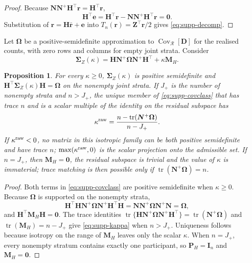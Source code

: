 \documentclass[12pt,a4paper]{article}
\newtheorem{proposition}{Proposition}
\theoremstyle{definition}
\theoremstyle{remark}\newtheorem{remark}{Remark}
\numberwithin{equation}{section}
\newcommand{\Cov}{\operatorname{Cov}}
\newcommand{\Rcal}{\mathcal R}
\begin{document}
\begin{proof}
Because $\bm N\bm N^+\bm H^\top\bm r=\bm H^\top\bm r$,
\[
\bm H^\top\bm e
=\bm H^\top\bm r-\bm N\bm N^+\bm H^\top\bm r
=\bm0.
\]
Substitution of $\bm r=\bm H\bar{\bm r}+\bm e$ into $T_n(\bm r)=\bm Z^\top\bm r/2$ gives \eqref{eq:supp-decomp}.
\end{proof}

Let $\bm\Omega$ be a positive-semidefinite approximation to $\Cov_{\Rcal}[\bm D]$ for the realised counts, with zero rows and columns for empty joint strata. Consider
\begin{equation}\label{eq:supp-covclass}
\bm\Sigma_Z(\kappa)
=\bm H\bm N^+\bm\Omega\bm N^+\bm H^\top
+\kappa\bm M_H.
\end{equation}

\begin{proposition}\label{prop:supp-completion}
For every $\kappa\ge0$, $\bm\Sigma_Z(\kappa)$ is positive semidefinite and $\bm H^\top\bm\Sigma_Z(\kappa)\bm H=\bm\Omega$ on the nonempty joint strata. If $J_+$ is the number of nonempty strata and $n>J_+$, the unique member of \eqref{eq:supp-covclass} that has trace $n$ and is a scalar multiple of the identity on the residual subspace has
\begin{equation}\label{eq:supp-kappa}
\kappa^{\rm raw}
=\frac{n-\operatorname{tr}(\bm N^+\bm\Omega)}{n-J_+}.
\end{equation}
If $\kappa^{\rm raw}<0$, no matrix in this isotropic family can be both positive semidefinite and have trace $n$; $\max(\kappa^{\rm raw},0)$ is the scalar projection onto the admissible set. If $n=J_+$, then $\bm M_H=\bm0$, the residual subspace is trivial and the value of $\kappa$ is immaterial; trace matching is then possible only if $\operatorname{tr}(\bm N^+\bm\Omega)=n$.
\end{proposition}

\begin{proof}
Both terms in \eqref{eq:supp-covclass} are positive semidefinite when $\kappa\ge0$. Because $\bm\Omega$ is supported on the nonempty strata,
\[
\bm H^\top\bm H\bm N^+\bm\Omega\bm N^+\bm H^\top\bm H
=\bm N\bm N^+\bm\Omega\bm N^+\bm N
=\bm\Omega,
\]
and $\bm H^\top\bm M_H\bm H=\bm0$. The trace identities $\operatorname{tr}\{\bm H\bm N^+\bm\Omega\bm N^+\bm H^\top\}=\operatorname{tr}(\bm N^+\bm\Omega)$ and $\operatorname{tr}(\bm M_H)=n-J_+$ give \eqref{eq:supp-kappa} when $n>J_+$. Uniqueness follows because isotropy on the range of $\bm M_H$ leaves only the scalar $\kappa$. When $n=J_+$, every nonempty stratum contains exactly one participant, so $\bm P_H=\bm I_n$ and $\bm M_H=\bm0$.
\end{proof}
\end{document}
